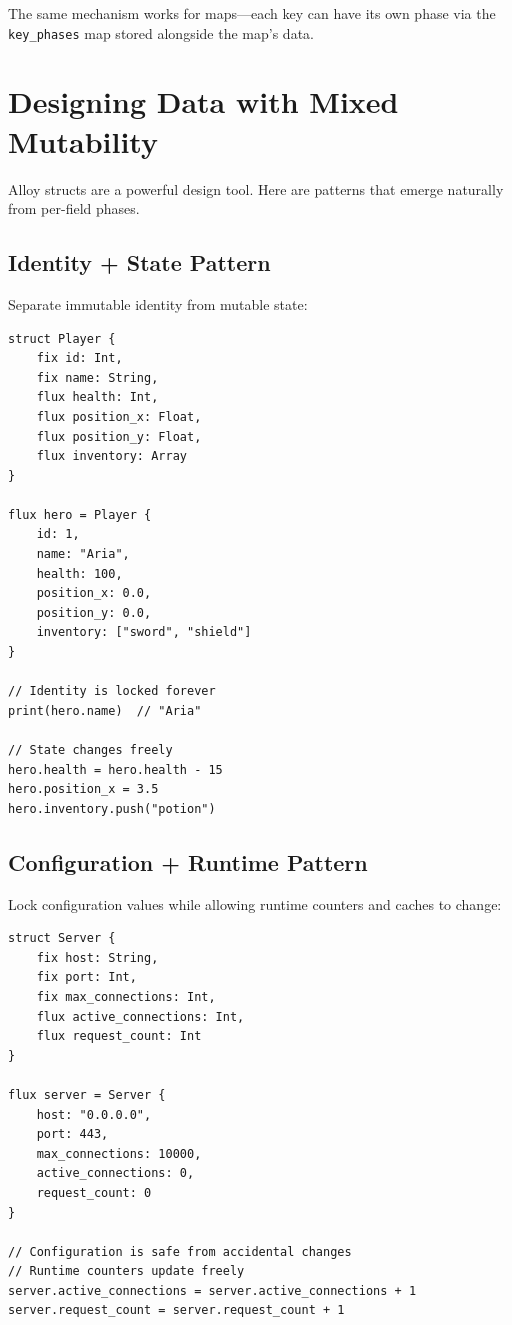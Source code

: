 The same mechanism works for maps---each key can have its own phase via the \lstinline|key_phases| map stored alongside the map's data.

\section{Designing Data with Mixed Mutability}\label{sec:designing-mixed-mutability}


Alloy structs are a powerful design tool.
Here are patterns that emerge naturally from per-field phases.

\subsection{Identity + State Pattern}

Separate immutable identity from mutable state:

\begin{lstlisting}[language=Lattice, caption={Identity + State pattern}]
struct Player {
    fix id: Int,
    fix name: String,
    flux health: Int,
    flux position_x: Float,
    flux position_y: Float,
    flux inventory: Array
}

flux hero = Player {
    id: 1,
    name: "Aria",
    health: 100,
    position_x: 0.0,
    position_y: 0.0,
    inventory: ["sword", "shield"]
}

// Identity is locked forever
print(hero.name)  // "Aria"

// State changes freely
hero.health = hero.health - 15
hero.position_x = 3.5
hero.inventory.push("potion")
\end{lstlisting}

\subsection{Configuration + Runtime Pattern}

Lock configuration values while allowing runtime counters and caches to change:

\begin{lstlisting}[language=Lattice, caption={Configuration + Runtime pattern}]
struct Server {
    fix host: String,
    fix port: Int,
    fix max_connections: Int,
    flux active_connections: Int,
    flux request_count: Int
}

flux server = Server {
    host: "0.0.0.0",
    port: 443,
    max_connections: 10000,
    active_connections: 0,
    request_count: 0
}

// Configuration is safe from accidental changes
// Runtime counters update freely
server.active_connections = server.active_connections + 1
server.request_count = server.request_count + 1
\end{lstlisting}

